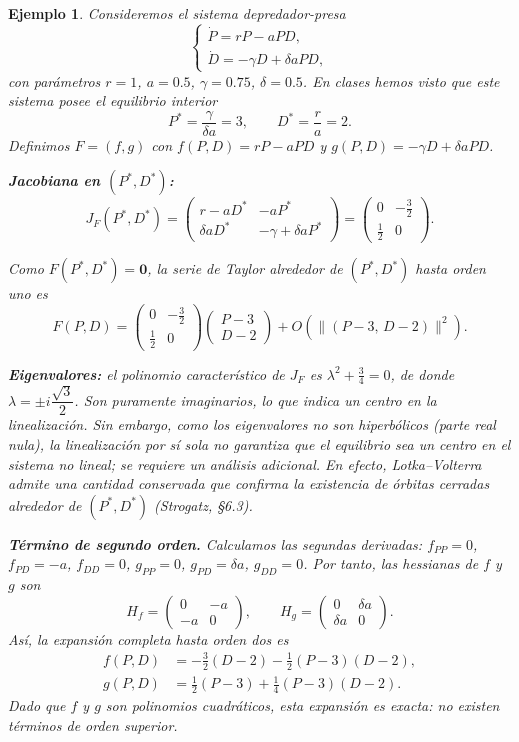 \documentclass[11pt,letterpaper]{article}
\newtheorem{ejemplo}{Ejemplo}[section]
\begin{document}
\begin{ejemplo}
Consideremos el sistema depredador-presa
\[
  \begin{cases}
    \dot{P} = rP - aPD,\\[4pt]
    \dot{D} = -\gamma D + \delta a PD,
  \end{cases}
\]
con parámetros $r=1$, $a=0.5$, $\gamma=0.75$, $\delta=0.5$.
En clases hemos visto que este sistema posee el equilibrio interior
\[
  P^* = \frac{\gamma}{\delta a} = 3,
  \qquad
  D^* = \frac{r}{a} = 2.
\]
Definimos $F=(f,g)$ con $f(P,D)=rP-aPD$ y $g(P,D)=-\gamma D+\delta aPD$.

\textbf{Jacobiana en $(P^*,D^*)$:}
\[
  J_F(P^*,D^*)
  = \begin{pmatrix}
      r - aD^* & -aP^*\\
      \delta a D^* & -\gamma + \delta a P^*
    \end{pmatrix}
  = \begin{pmatrix} 0 & -\tfrac{3}{2}\\[4pt] \tfrac{1}{2} & 0 \end{pmatrix}.
\]

Como $F(P^*,D^*)=\mathbf{0}$, la serie de Taylor alrededor de $(P^*,D^*)$
hasta orden uno es
\[
  F(P,D)
  = \begin{pmatrix} 0 & -\tfrac{3}{2}\\[4pt] \tfrac{1}{2} & 0 \end{pmatrix}
    \begin{pmatrix} P - 3\\ D - 2 \end{pmatrix}
  + O\!\left(\|(P-3,\,D-2)\|^2\right).
\]

\textbf{Eigenvalores:} el polinomio característico de $J_F$ es
$\lambda^2 + \tfrac{3}{4} = 0$, de donde $\lambda = \pm i\dfrac{\sqrt{3}}{2}$.
Son puramente imaginarios, lo que indica un \emph{centro} en la linealización.
Sin embargo, como los eigenvalores no son hiperbólicos (parte real nula),
la linealización por sí sola no garantiza que el equilibrio sea un centro
en el sistema no lineal; se requiere un análisis adicional.
En efecto, Lotka--Volterra admite una cantidad conservada que confirma
la existencia de órbitas cerradas alrededor de $(P^*,D^*)$ (Strogatz, \S6.3).

\textbf{Término de segundo orden.} Calculamos las segundas derivadas:
$f_{PP}=0$, $f_{PD}=-a$, $f_{DD}=0$, $g_{PP}=0$, $g_{PD}=\delta a$,
$g_{DD}=0$. Por tanto, las hessianas de $f$ y $g$ son
\[
  H_f = \begin{pmatrix} 0 & -a\\ -a & 0 \end{pmatrix},
  \qquad
  H_g = \begin{pmatrix} 0 & \delta a\\ \delta a & 0 \end{pmatrix}.
\]
Así, la expansión completa hasta orden dos es
\begin{align*}
  f(P,D) &= -\tfrac{3}{2}(D-2) - \tfrac{1}{2}(P-3)(D-2),\\
  g(P,D) &= \tfrac{1}{2}(P-3) + \tfrac{1}{4}(P-3)(D-2).
\end{align*}
Dado que $f$ y $g$ son polinomios cuadráticos, esta expansión es \emph{exacta}:
no existen términos de orden superior.


\end{ejemplo}
\end{document}
